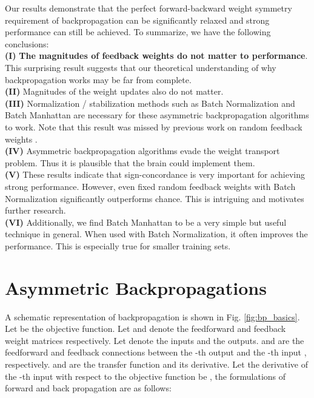 \documentclass[letterpaper]{article}
\begin{document}
Our results demonstrate that the perfect forward-backward weight symmetry requirement of backpropagation can be significantly relaxed and strong performance can still be achieved.  To summarize, we have the following conclusions: \\
\textbf{(I)} \textbf{The magnitudes of feedback weights do not matter to performance}. This surprising result suggests that our theoretical understanding of why backpropagation works may be far from complete.\\
\textbf{(II)} Magnitudes of the weight updates also do not matter.\\
\textbf{(III)} Normalization / stabilization methods such as Batch Normalization and Batch Manhattan are necessary for these asymmetric backpropagation algorithms to work. Note that this result was missed by previous work on random feedback weights \cite{lillicrap2014random}.  \\
\textbf{(IV)} Asymmetric backpropagation algorithms evade the weight transport problem. Thus it is plausible that the brain could implement them. \\
\textbf{(V)} These results indicate that sign-concordance is very important for achieving strong performance. However, even fixed random feedback weights with Batch Normalization significantly outperforms chance. This is intriguing and motivates further research. \\
\textbf{(VI)} Additionally, we find Batch Manhattan to be a very simple but useful technique in general. When used with Batch Normalization, it often improves the performance. This is especially true for smaller training sets.


\section{Asymmetric Backpropagations}
\label{sec:abp}

A schematic representation of backpropagation is shown in Fig. \ref{fig:bp_basics}. Let  be the objective function.  Let  and  denote the feedforward and feedback weight matrices respectively.  Let  denote the inputs and  the outputs.  and  are the feedforward and feedback connections between the -th output  and the -th input , respectively.  and  are the transfer function and its derivative. Let the derivative of the -th input with respect to the objective function be , the formulations of forward and back propagation are as follows:  \\
\end{document}
